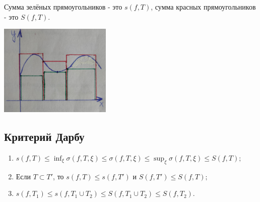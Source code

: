     Сумма зелёных прямоугольников - это $s(f, T)$, сумма красных прямоугольников - это $S(f, T)$.
    
    \begin{center}
    	\includegraphics[width=0.4\textwidth]{img/lecture25/integral_darbu}
    \end{center}
    
    \subsection{Критерий Дарбу}
    
    \begin{lemma}
    	\begin{enumerate}
    		\item $s(f, T) \leqslant \displaystyle\inf_{\xi} \sigma(f, T, \xi) \leqslant \sigma(f, T, \xi) \leqslant \sup_{\xi}{\sigma(f, T, \xi)} \leqslant S(f, T);$
    		\item Если $T \subset T'$, то $s(f, T) \leqslant s(f, T')$ и $S(f, T') \leqslant S(f, T);$
    		\item $s(f, T_1) \leqslant s(f, T_1 \cup T_2) \leqslant S(f, T_1 \cup T_2) \leqslant S(f, T_2).$ 
    	\end{enumerate}
    \end{lemma}
    
